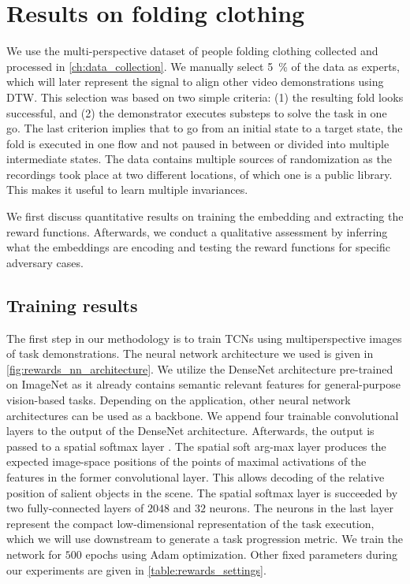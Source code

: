 \documentclass[\home/main.tex]{subfiles}
\begin{document}
\section{Results on folding clothing}\label{sec:rewards_results}
We use the multi-perspective dataset of people folding clothing collected and processed in \cref{ch:data_collection}.
We manually select \qty{5}{\percent} of the data as experts, which will later represent the signal to align other video demonstrations using DTW. This selection was based on two simple criteria: (1) the resulting fold looks successful, and (2) the demonstrator executes substeps to solve the task in one go. The last criterion implies that to go from an initial state to a target state, the fold is executed in one flow and not paused in between or divided into multiple intermediate states. The data contains multiple sources of randomization as the recordings took place at two different locations, of which one is a public library. This makes it useful to learn multiple invariances.

We first discuss quantitative results on training the embedding and extracting the reward functions. Afterwards, we conduct a qualitative assessment by inferring what the embeddings are encoding and testing the reward functions for specific adversary cases.

\subsection{Training results}

The first step in our methodology is to train TCNs using multiperspective images of task demonstrations. The neural network architecture we used is given in \cref{fig:rewards_nn_architecture}. We utilize the DenseNet \autocite{DenseNet2017} architecture pre-trained on ImageNet \autocite{ImageNet} as it already contains semantic relevant features for general-purpose vision-based tasks. Depending on the application, other neural network architectures can be used as a backbone. We append four trainable convolutional layers to the output of the DenseNet architecture. Afterwards, the output is passed to a spatial softmax layer \autocite{Levine2016}. The spatial soft arg-max layer produces the expected image-space positions of the points of maximal activations of the features in the former convolutional layer. This allows decoding of the relative position of salient objects in the scene. The spatial softmax layer is succeeded by two fully-connected layers of $2048$ and $32$ neurons. The neurons in the last layer represent the compact low-dimensional representation of the task execution, which we will use downstream to generate a task progression metric. We train the network for $500$ epochs using Adam optimization. Other fixed parameters during our experiments are given in \cref{table:rewards_settings}.
\end{document}
